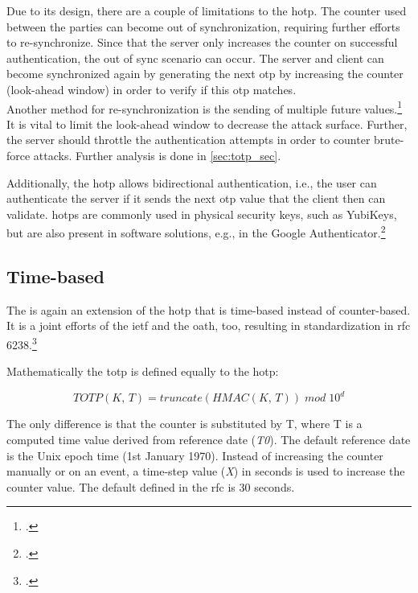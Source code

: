 Due to its design, there are a couple of limitations to the \gls{hotp}. The counter used between the parties can become out of synchronization, requiring further efforts to re-synchronize. Since that the server only increases the counter on successful authentication, the out of sync scenario can occur. The server and client can become synchronized again by generating the next \gls{otp} by increasing the counter (look-ahead window) in order to verify if this \gls{otp} matches.\\
Another method for re-synchronization is the sending of multiple future values.\footcites[See][236]{Schwartz2018}[See][Chapter 13.5.1]{2308830} It is vital to limit the look-ahead window to decrease the attack surface. Further, the server should throttle the authentication attempts in order to counter brute-force attacks. Further analysis is done in \autoref{sec:totp_sec}.

Additionally, the \gls{hotp} allows bidirectional authentication, i.e., the user can authenticate the server if it sends the next \gls{otp} value that the client then can validate. \Glspl{hotp} are commonly used in physical security keys, such as YubiKeys, but are also present in software solutions, e.g., in the Google Authenticator.\footcites[See][716]{HUSEYNOV2017715}[See][14]{m2005rfc}

\subsection{Time-based}
\label{subsec:totp}

The  is again an extension of the \gls{hotp} that is time-based instead of counter-based. It is a joint efforts of the \gls{ietf} and the \gls{oath}, too, resulting in standardization in \gls{rfc} 6238.\footcite[See][]{m2011rfc}

Mathematically the \gls{totp} is defined equally to the \gls{hotp}:

\begin{equation*}
	TOTP(K,\, T) = truncate(HMAC(K,\, T))\; mod \; 10^d
\end{equation*}

The only difference is that the counter is substituted by T, where T is a computed time value derived from reference date (\textit{T0}). The default reference date is the Unix epoch time (1st January 1970). Instead of increasing the counter manually or on an event, a time-step value (\textit{X}) in seconds is used to increase the counter value. The default defined in the \gls{rfc} is 30 seconds.

